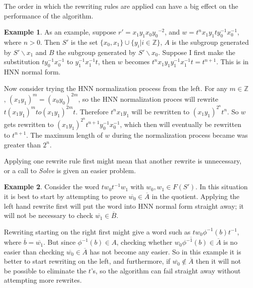 \documentclass[11pt]{article} %
\theoremstyle{definition}
\theoremstyle{definition}
\theoremstyle{definition}
\theoremstyle{definition}
\theoremstyle{definition}
\theoremstyle{definition}
\newtheorem{exmpl}{Example}[theorem]
\begin{document}
The order in which the rewriting rules are applied can have a big effect on the performance
of the algorithm.

\begin{exmpl}\label{ltrbad}
As an example, suppose $r' = {x_1y_1}{x_0y_0}^{-2}$, and
$w = t^n x_1y_1 t y_0^{-1}x_0^{-1}$, where $n > 0$.
Then $S'$ is the set $\{x_0, x_1\} \cup \{y_i | i \in \mathbb{Z}\}$,
$A$ is the subgroup generated by $S' \backslash x_1$ and
$B$ the subgroup generated by $S' \backslash x_0$.
Suppose I first make the substitution $ty_0^{-1}x_0^{-1}$ to $y_1^{-1}x_1^{-1} t$,
then $w$ becomes $t^{n}x_1y_1y_1^{-1}x_1^{-1}t = t^{n+1}$.
This is in HNN normal form.

Now consider trying the HNN normalization process from the left.
For any $m \in \mathbb{Z}$, $(x_1y_1)^m = (x_0y_0)^{2m}$,
so the HNN normalization proces will rewrite $t(x_1y_1)^m to (x_1y_1)^{2m}t$.
Therefore $t^nx_1y_1$ will be rewritten to $(x_1y_1)^{2^n}t^n$.
So $w$ gets rewritten to $(x_1y_1)^{2^n} t^{n+1} y_0^{-1}x_0^{-1}$,
which then will eventually be rewritten to $t^{n+1}$. The maximum length
of $w$ during the normalization process became was greater than $2^n$.
\end{exmpl}

Applying one rewrite rule first
might mean that another rewrite is unnecessary, or a call to \textit{Solve} is
given an easier problem.

\begin{exmpl}\label{rtlbad}
Consider the word $tw_0t^{-1}w_1$ with $w_0, w_1 \in F(S')$. In this situation
it is best to start by attempting to prove $\overline{w_0} \in \overline{A}$ in the quotient.
Applying the left hand rewrite first will put the word into HNN normal form
straight away; it will not be necessary to check $\overline{w_1} \in \overline{B}$.

Rewriting starting on the right first might give a word such as
$tw_0 \phi^{-1}(b)t^{-1}$, where $\overline{b} = \overline{w_1}$. But since
$\phi^{-1}(b) \in A$, checking whether $\overline{w_0\phi^{-1}(b)} \in \overline{A}$ is
no easier than checking $\overline{w_0} \in \overline{A}$ has not become
any easier. So in this example it is better to start rewriting on the left, and furthermore,
if $\overline{w_0} \notin \overline{A}$ then it will not be possible to eliminate the $t$'s, so the
algorithm can fail straight away without attempting more rewrites.



\end{exmpl}
\end{document}
